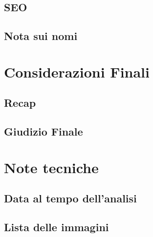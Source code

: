 \documentclass[a4paper, oneside, openany, dvipsnames, table]{article}
\begin{document}
	\subsection{SEO}
		
	\subsection{Nota sui nomi}
		

	
\newpage
\section{Considerazioni Finali}
	\subsection{Recap}
		
	\subsection{Giudizio Finale}
		
\newpage
\section{Note tecniche}
	\subsection{Data al tempo dell'analisi}
		
	\subsection{Lista delle immagini}
		
\end{document}
